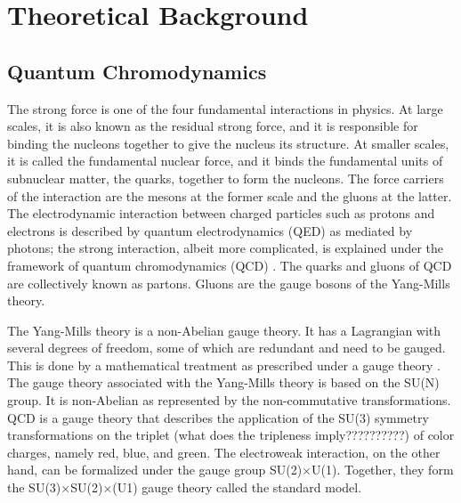 \chapter{Theoretical Background} \label{ch:background}




\section{Quantum Chromodynamics}\label{section:QCD}
The strong force is one of the four fundamental interactions in physics. At large scales, it is also known as the residual strong force, and it is responsible for binding the nucleons together to give the nucleus its structure. At smaller scales, it is called the fundamental nuclear force, and it binds the fundamental units of subnuclear matter, the quarks, together to form the nucleons. The force carriers of the interaction are the mesons at the former scale and the gluons at the latter. %
The electrodynamic interaction between charged particles such as protons and electrons is described by quantum electrodynamics (QED) as mediated by photons; the strong interaction, albeit more complicated, is explained under the framework of quantum chromodynamics (QCD) \cite{KAPUSTA1979461, Shuryak1988}. The quarks and gluons of QCD are collectively known as partons. Gluons are the gauge bosons of the Yang-Mills theory.

The Yang-Mills theory is a non-Abelian gauge theory. It has a Lagrangian with several degrees of freedom, some of which are redundant and need to be gauged. This is done by a mathematical treatment as prescribed under a gauge theory \cite{aitchison2003gauge}. The gauge theory associated with the Yang-Mills theory is based on the SU(N) group. It is non-Abelian as represented by the non-commutative transformations. QCD is a gauge theory that describes the application of the SU(3) symmetry transformations on the triplet (what does the tripleness imply??????????) of color charges, namely red, blue, and green. The electroweak interaction, on the other hand, can be formalized under the gauge group SU(2)$\times$U(1). Together, they form the SU(3)$\times$SU(2)$\times$(U1) gauge theory called the standard model.

